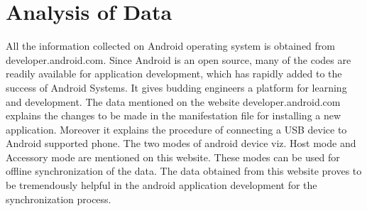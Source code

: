 \section{Analysis of Data}
\hspace*{0.82cm}All the information collected on Android operating system is obtained from
developer.android.com. Since Android is an open source, many of the codes are readily
available for application development, which has rapidly added to the success of Android
Systems. It gives budding engineers a platform for learning and development. The data
mentioned on the website developer.android.com explains the changes to be made in the
manifestation file for installing a new application. Moreover it explains the procedure of
connecting a USB device to Android supported phone. The two modes of android device viz.
Host mode and Accessory mode are mentioned on this website. These modes can be used for
offline synchronization of the data. The data obtained from this website proves to be
tremendously helpful in the android application development for the synchronization process.